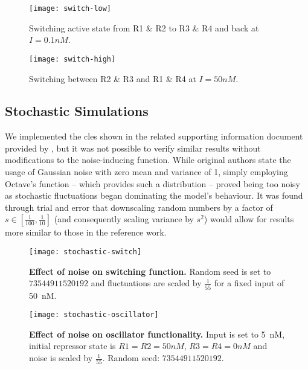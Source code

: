 
    \begin{figure}[!htb]
      \centering
      \texttt{[image: switch-low]}
      \caption{Switching active state from R1 \& R2 to R3 \& R4 and back at $I = 0.1 nM$.}
      \label{fig:switch-low}
    \end{figure}

    \begin{figure}[!htb]
      \centering
      \texttt{[image: switch-high]}
      \caption{Switching between R2 \& R3 and R1 \& R4 at $I = 50 nM$.}
      \label{fig:switch-high}
    \end{figure}


  \subsection{Stochastic Simulations}

    We implemented the \ac{cles} shown in the related supporting information document provided by \citet{multif}, but it was not possible to verify similar results without modifications to the noise-inducing function.
    While original authors state the usage of Gaussian noise with zero mean and variance of 1, simply employing Octave's  function -- which provides such a distribution \cite{randn} -- proved being too noisy as stochastic fluctuations began dominating the model's behaviour.
    It was found through trial and error that downscaling random numbers by a factor of $s \in [\frac{1}{100}, \frac{1}{10}]$ (and consequently scaling variance by $s^2$) would allow for results more similar to those in the reference work.

    \begin{figure}[!htb]
      \centering
      \texttt{[image: stochastic-switch]}
      \caption{\textbf{Effect of noise on switching function.} Random seed is set to $73544911520192$ and fluctuations are scaled by $\frac{1}{55}$ for a fixed input of \SI{50}{\nano M}.}
      \label{fig:stochastic-switch}
    \end{figure}

    \begin{figure}[!htb]
      \centering
      \texttt{[image: stochastic-oscillator]}
      \caption{\textbf{Effect of noise on oscillator functionality.} Input is set to \SI{5}{\nano M}, initial repressor state is $R1 = R2 = 50nM$, $R3 = R4 = 0nM$ and noise is scaled by $\frac{1}{55}$. Random seed: $73544911520192$.}
      \label{fig:stochastic-oscillator}
    \end{figure}

